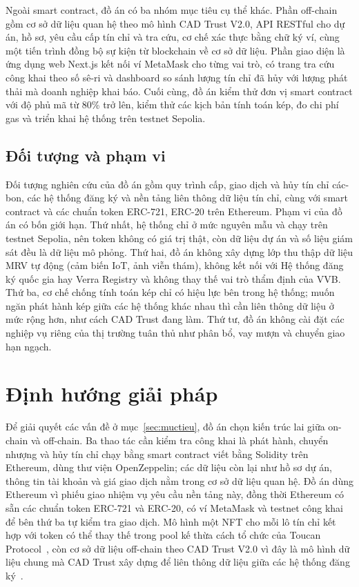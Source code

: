 Ngoài smart contract, đồ án có ba nhóm mục tiêu cụ thể khác. Phần off-chain gồm cơ sở dữ liệu quan hệ theo mô hình CAD Trust V2.0, API RESTful cho dự án, hồ sơ, yêu cầu cấp tín chỉ và tra cứu, cơ chế xác thực bằng chữ ký ví, cùng một tiến trình đồng bộ sự kiện từ blockchain về cơ sở dữ liệu. Phần giao diện là ứng dụng web Next.js kết nối ví MetaMask cho từng vai trò, có trang tra cứu công khai theo số sê-ri và dashboard so sánh lượng tín chỉ đã hủy với lượng phát thải mà doanh nghiệp khai báo. Cuối cùng, đồ án kiểm thử đơn vị smart contract với độ phủ mã từ 80\% trở lên, kiểm thử các kịch bản tính toán kép, đo chi phí gas và triển khai hệ thống trên testnet Sepolia.

\subsection*{Đối tượng và phạm vi}
\label{subsec:phamvi}

Đối tượng nghiên cứu của đồ án gồm quy trình cấp, giao dịch và hủy tín chỉ các-bon, các hệ thống đăng ký và nền tảng liên thông dữ liệu tín chỉ, cùng với smart contract và các chuẩn token ERC-721, ERC-20 trên Ethereum. Phạm vi của đồ án có bốn giới hạn. Thứ nhất, hệ thống chỉ ở mức nguyên mẫu và chạy trên testnet Sepolia, nên token không có giá trị thật, còn dữ liệu dự án và số liệu giám sát đều là dữ liệu mô phỏng. Thứ hai, đồ án không xây dựng lớp thu thập dữ liệu MRV tự động (cảm biến IoT, ảnh viễn thám), không kết nối với Hệ thống đăng ký quốc gia hay Verra Registry và không thay thế vai trò thẩm định của VVB. Thứ ba, cơ chế chống tính toán kép chỉ có hiệu lực bên trong hệ thống; muốn ngăn phát hành kép giữa các hệ thống khác nhau thì cần liên thông dữ liệu ở mức rộng hơn, như cách CAD Trust đang làm. Thứ tư, đồ án không cài đặt các nghiệp vụ riêng của thị trường tuân thủ như phân bổ, vay mượn và chuyển giao hạn ngạch.

\section{Định hướng giải pháp}
\label{sec:dinhhuong}
\label{subsec:phuongphap}
\label{subsec:ynghia}

Để giải quyết các vấn đề ở mục~\ref{sec:muctieu}, đồ án chọn kiến trúc lai giữa on-chain và off-chain. Ba thao tác cần kiểm tra công khai là phát hành, chuyển nhượng và hủy tín chỉ chạy bằng smart contract viết bằng Solidity trên Ethereum, dùng thư viện OpenZeppelin; các dữ liệu còn lại như hồ sơ dự án, thông tin tài khoản và giá giao dịch nằm trong cơ sở dữ liệu quan hệ. Đồ án dùng Ethereum vì phiếu giao nhiệm vụ yêu cầu nền tảng này, đồng thời Ethereum có sẵn các chuẩn token ERC-721 và ERC-20, có ví MetaMask và testnet công khai để bên thứ ba tự kiểm tra giao dịch. Mô hình một NFT cho mỗi lô tín chỉ kết hợp với token có thể thay thế trong pool kế thừa cách tổ chức của Toucan Protocol~\cite{toucan2025docs}, còn cơ sở dữ liệu off-chain theo CAD Trust V2.0 vì đây là mô hình dữ liệu chung mà CAD Trust xây dựng để liên thông dữ liệu giữa các hệ thống đăng ký~\cite{cadtrust2025datamodel}.

